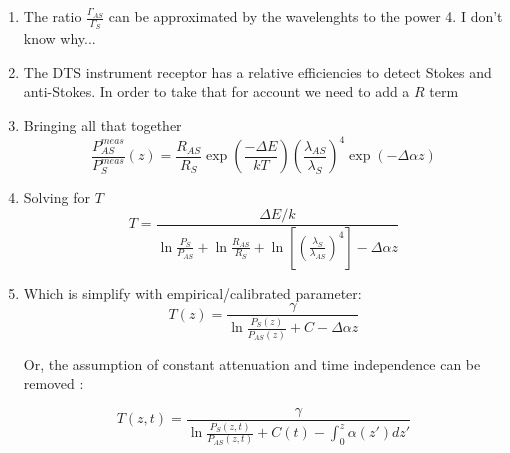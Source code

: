 \documentclass[twocolumn]{article}
\numberwithin{equation}{section}
\begin{document}
\begin{enumerate}
\item The ratio $\frac{\Gamma_{AS}}{\Gamma_{S}}$ can be approximated by the wavelenghts to the power 4. I don't know why...
\item The DTS instrument receptor has a relative efficiencies to detect Stokes and anti-Stokes. In order to take that for account we need to add a $R$ term
\item Bringing all that together
$$\frac{P_{AS}^{meas}}{P_{S}^{meas}}(z)=\frac{R_{AS}}{R_S}\exp\left(\frac{-\Delta E}{kT}\right) \left( \frac{\lambda_{AS}}{\lambda_{S}}  \right)^4 \exp (-\Delta  \alpha z)$$
\item Solving for $T$
$$T = \frac{\Delta E/k}{\ln\frac{P_S}{P_{AS}} + \ln\frac{R_{AS}}{R_{S}} + \ln\left[\left(\frac{\lambda_S}{\lambda_{AS}}\right)^4\right] - \Delta\alpha z}$$

\item Which is simplify with empirical/calibrated parameter:
$$ T(z) = \frac{\gamma}{\ln\frac{P_S(z)}{P_{AS}(z)} + C - \Delta\alpha z}$$


Or, the assumption of constant attenuation and time independence can be removed :

$$ T(z,t) = \frac{\gamma}{\ln\frac{P_S(z,t)}{P_{AS}(z,t)} + C(t) - \int_0^z \alpha(z') dz'}$$


\end{enumerate}
\end{document}
